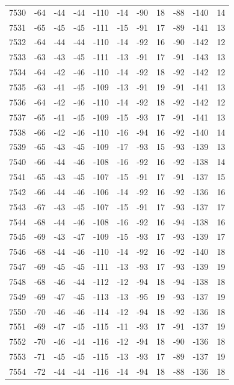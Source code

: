\begin{table}[H]
\begin{tabular}{lllllllllll}
7530 & -64 & -44 & -44 & -110 & -14 & -90 & 18 & -88 & -140 & 14 \\
7531 & -65 & -45 & -45 & -111 & -15 & -91 & 17 & -89 & -141 & 13 \\
7532 & -64 & -44 & -44 & -110 & -14 & -92 & 16 & -90 & -142 & 12 \\
7533 & -63 & -43 & -45 & -111 & -13 & -91 & 17 & -91 & -143 & 13 \\
7534 & -64 & -42 & -46 & -110 & -14 & -92 & 18 & -92 & -142 & 12 \\
7535 & -63 & -41 & -45 & -109 & -13 & -91 & 19 & -91 & -141 & 13 \\
7536 & -64 & -42 & -46 & -110 & -14 & -92 & 18 & -92 & -142 & 12 \\
7537 & -65 & -41 & -45 & -109 & -15 & -93 & 17 & -91 & -141 & 13 \\
7538 & -66 & -42 & -46 & -110 & -16 & -94 & 16 & -92 & -140 & 14 \\
7539 & -65 & -43 & -45 & -109 & -17 & -93 & 15 & -93 & -139 & 13 \\
7540 & -66 & -44 & -46 & -108 & -16 & -92 & 16 & -92 & -138 & 14 \\
7541 & -65 & -43 & -45 & -107 & -15 & -91 & 17 & -91 & -137 & 15 \\
7542 & -66 & -44 & -46 & -106 & -14 & -92 & 16 & -92 & -136 & 16 \\
7543 & -67 & -43 & -45 & -107 & -15 & -91 & 17 & -93 & -137 & 17 \\
7544 & -68 & -44 & -46 & -108 & -16 & -92 & 16 & -94 & -138 & 16 \\
7545 & -69 & -43 & -47 & -109 & -15 & -93 & 17 & -93 & -139 & 17 \\
7546 & -68 & -44 & -46 & -110 & -14 & -92 & 16 & -92 & -140 & 18 \\
7547 & -69 & -45 & -45 & -111 & -13 & -93 & 17 & -93 & -139 & 19 \\
7548 & -68 & -46 & -44 & -112 & -12 & -94 & 18 & -94 & -138 & 18 \\
7549 & -69 & -47 & -45 & -113 & -13 & -95 & 19 & -93 & -137 & 19 \\
7550 & -70 & -46 & -46 & -114 & -12 & -94 & 18 & -92 & -136 & 18 \\
7551 & -69 & -47 & -45 & -115 & -11 & -93 & 17 & -91 & -137 & 19 \\
7552 & -70 & -46 & -44 & -116 & -12 & -94 & 18 & -90 & -136 & 18 \\
7553 & -71 & -45 & -45 & -115 & -13 & -93 & 17 & -89 & -137 & 19 \\
7554 & -72 & -44 & -44 & -116 & -14 & -94 & 18 & -88 & -136 & 18 \\

\end{tabular}
\end{table}
